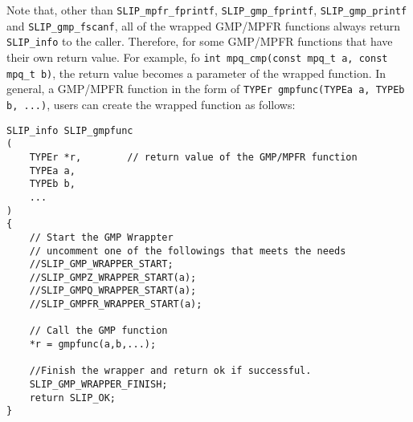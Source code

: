 \documentclass[12pt]{article}
\theoremstyle{definition}
\begin{document}
Note that, other than \verb|SLIP_mpfr_fprintf|, \verb|SLIP_gmp_fprintf|,
\verb|SLIP_gmp_printf| and \verb|SLIP_gmp_fscanf|, all of the wrapped GMP/MPFR
functions always return \verb|SLIP_info| to the caller. Therefore, for some
GMP/MPFR functions that have their own return value.  For example, fo
\verb|int mpq_cmp(const mpq_t a, const mpq_t b)|, the return value becomes a
parameter of the wrapped function. In general, a GMP/MPFR function in the form
of \verb|TYPEr gmpfunc(TYPEa a, TYPEb b, ...)|, users can create the wrapped
function as follows:

\begin{mdframed}[userdefinedwidth=6in]
{\footnotesize
\begin{verbatim}
SLIP_info SLIP_gmpfunc
(
    TYPEr *r,        // return value of the GMP/MPFR function
    TYPEa a,
    TYPEb b,
    ...
)
{
    // Start the GMP Wrappter
    // uncomment one of the followings that meets the needs
    //SLIP_GMP_WRAPPER_START;
    //SLIP_GMPZ_WRAPPER_START(a);
    //SLIP_GMPQ_WRAPPER_START(a);
    //SLIP_GMPFR_WRAPPER_START(a);

    // Call the GMP function
    *r = gmpfunc(a,b,...);

    //Finish the wrapper and return ok if successful.
    SLIP_GMP_WRAPPER_FINISH;
    return SLIP_OK;
}
\end{verbatim}
} \end{mdframed}
\end{document}
